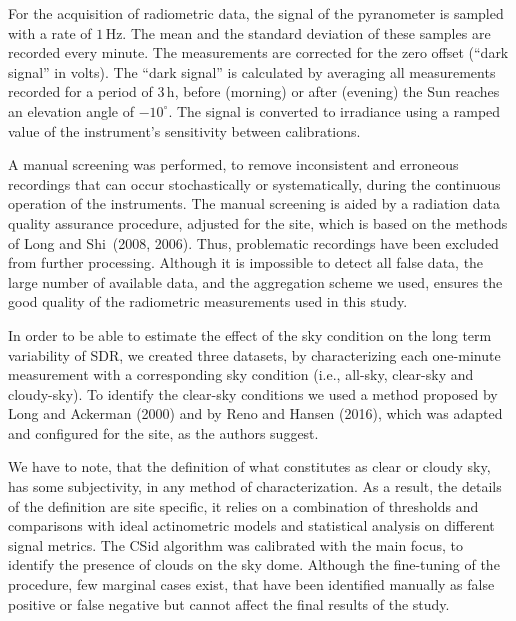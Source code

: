 \documentclass[
]{article}
\begin{document}
For the acquisition of radiometric data, the signal of the pyranometer is sampled with a rate of \(1\,\text{Hz}\).
The mean and the standard deviation of these samples are recorded every minute.
The measurements are corrected for the zero offset (``dark signal'' in volts).
The ``dark signal'' is calculated by averaging all measurements recorded for a period of
\(3\,\text{h}\),
before (morning) or after (evening) the Sun reaches an elevation angle of
\(-10^\circ\).
The signal is converted to irradiance using a ramped value of the instrument's sensitivity between calibrations.

A manual screening was performed, to remove inconsistent and erroneous recordings that can occur stochastically or systematically, during the continuous operation of the instruments.
The manual screening is aided by a radiation data quality assurance procedure, adjusted for the site, which is based on the methods of
Long and Shi~(2008, 2006).
Thus, problematic recordings have been excluded from further processing.
Although it is impossible to detect all false data, the large number of available data, and the aggregation scheme we used, ensures the good quality of the radiometric measurements used in this study.

In order to be able to estimate the effect of the sky condition on the long term variability of SDR, we created three datasets, by characterizing each one-minute measurement with a corresponding sky condition (i.e., all-sky, clear-sky and cloudy-sky).
To identify the clear-sky conditions we used a method proposed by
Long and Ackerman (2000)
and by
Reno and Hansen (2016),
which was adapted and configured for the site, as the authors suggest.

We have to note, that the definition of what constitutes as clear or cloudy sky, has some subjectivity, in any method of characterization.
As a result, the details of the definition are site specific, it relies on a combination of thresholds and comparisons with ideal actinometric models and statistical analysis on different signal metrics.
The CSid algorithm was calibrated with the main focus, to identify the presence of clouds on the sky dome.
Although the fine-tuning of the procedure, few marginal cases exist, that have been identified manually as false positive or false negative but cannot affect the final results of the study.
\end{document}
